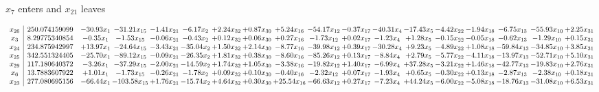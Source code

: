 \documentclass[9pt]{article}
\begin{document}
 $ x_{7} $ enters and $ x_{21} $ leaves 

 \[\begin{array}{c| c c@{\hskip 2pt} c@{\hskip 2pt} c@{\hskip 2pt} c@{\hskip 2pt} c@{\hskip 2pt} c@{\hskip 2pt} c@{\hskip 2pt} c@{\hskip 2pt} c@{\hskip 2pt} c@{\hskip 2pt} c@{\hskip 2pt} c@{\hskip 2pt} c@{\hskip 2pt} c@{\hskip 2pt} c@{\hskip 2pt} c@{\hskip 2pt} }
 x_{26}   &  250.074159099 & -30.93 x_{1} & -31.21 x_{15} & -1.41 x_{21} & -6.17 x_{2} & +  2.24 x_{32} & +  0.87 x_{30} & +  5.24 x_{16} & -54.17 x_{12} & -0.37 x_{17} & -40.31 x_{4} & -17.43 x_{5} & -4.42 x_{22} & -1.94 x_{18} & -6.75 x_{13} & -55.93 x_{10} & +  2.25 x_{31}\\
 x_{3}   &  8.29775340854 & -0.35 x_{1} & -1.53 x_{15} & -0.06 x_{21} & -0.43 x_{2} & +  0.12 x_{32} & +  0.06 x_{30} & +  0.27 x_{16} & -1.73 x_{12} & +  0.02 x_{17} & -1.23 x_{4} & +  1.28 x_{5} & -0.15 x_{22} & -0.05 x_{18} & -0.62 x_{13} & -1.29 x_{10} & +  0.15 x_{31}\\
 x_{24}   &  234.875942997 & + 13.97 x_{1} & -24.64 x_{15} & -3.43 x_{21} & -35.04 x_{2} & +  1.50 x_{32} & +  2.14 x_{30} & -8.77 x_{16} & -39.98 x_{12} & +  0.39 x_{17} & -30.28 x_{4} & +  9.23 x_{5} & -4.89 x_{22} & +  1.08 x_{18} & -59.84 x_{13} & -34.85 x_{10} & +  3.85 x_{31}\\
 x_{25}   &  342.551324405 & -25.70 x_{1} & -89.12 x_{15} & -0.09 x_{21} & -26.35 x_{2} & +  1.81 x_{32} & +  0.38 x_{30} & -8.60 x_{16} & -85.26 x_{12} & +  0.13 x_{17} & -8.84 x_{4} & +  2.79 x_{5} & -5.77 x_{22} & -4.11 x_{18} & -13.97 x_{13} & -52.71 x_{10} & +  5.10 x_{31}\\
 x_{29}   &  117.180640372 & -3.26 x_{1} & -37.29 x_{15} & -2.00 x_{21} & -14.59 x_{2} & +  1.74 x_{32} & +  1.05 x_{30} & -3.38 x_{16} & -19.82 x_{12} & +  1.40 x_{17} & -6.99 x_{4} & + 37.28 x_{5} & -3.21 x_{22} & +  1.46 x_{18} & -42.77 x_{13} & -19.83 x_{10} & +  2.76 x_{31}\\
 x_{6}   &  13.7883607922 & +  1.01 x_{1} & -1.73 x_{15} & -0.26 x_{21} & -1.78 x_{2} & +  0.09 x_{32} & +  0.10 x_{30} & -0.40 x_{16} & -2.32 x_{12} & +  0.07 x_{17} & -1.93 x_{4} & +  0.65 x_{5} & -0.30 x_{22} & +  0.13 x_{18} & -2.87 x_{13} & -2.38 x_{10} & +  0.18 x_{31}\\
 x_{23}   &  277.080695156 & -66.44 x_{1} & -103.58 x_{15} & +  1.76 x_{21} & -15.74 x_{2} & +  4.64 x_{32} & +  0.30 x_{30} & + 25.54 x_{16} & -66.63 x_{12} & +  0.27 x_{17} & -7.23 x_{4} & + 44.24 x_{5} & -6.00 x_{22} & -5.08 x_{18} & -18.76 x_{13} & -31.08 x_{10} & +  6.53 x_{31}\\

\end{array}\]
\end{document}
